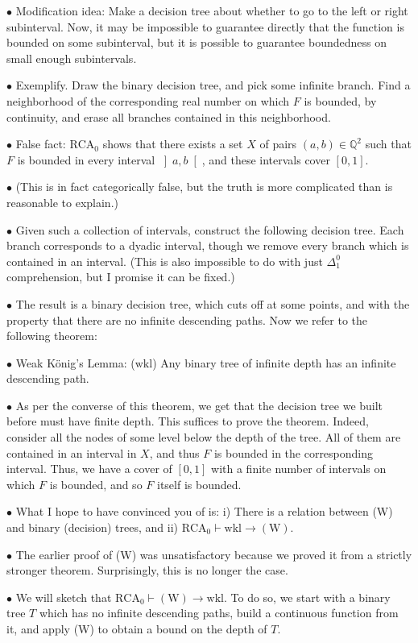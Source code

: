\documentclass{article}
\theoremstyle{nonumberplain}
\newcommand{\Q}{\mathbb{Q}}
\newcommand{\RCA}{\mathrm{RCA}}
\newcommand{\wkl}{\mathrm{wkl}}
\newcommand\point[1]{\noindent \hspace{\labelsep} $\bullet$ #1 \smallskip}
\newcommand\thname[1]{\mathrm{(#1)}}
\begin{document}
\point{Modification idea: Make a decision tree about whether to go to the left or right subinterval. Now, it may be impossible to guarantee directly that the function is bounded on some subinterval, but it is possible to guarantee boundedness on small enough subintervals.}

\point{Exemplify. Draw the binary decision tree, and pick some infinite branch. Find a neighborhood of the corresponding real number on which $F$ is bounded, by continuity, and erase all branches contained in this neighborhood.}

\point{False fact: $\RCA_0$ shows that there exists a set $X$ of pairs $(a,b) \in \Q^2$ such that $F$ is bounded in every interval $\left]a,b\right[$, and these intervals cover $[0,1]$.}

\point{(This is in fact categorically false, but the truth is more complicated than is reasonable to explain.)}

\point{Given such a collection of intervals, construct the following decision tree. Each branch corresponds to a dyadic interval, though we remove every branch which is contained in an interval. (This is also impossible to do with just $\Delta^0_1$ comprehension, but I promise it can be fixed.)}

\point{The result is a binary decision tree, which cuts off at some points, and with the property that there are no infinite descending paths. Now we refer to the following theorem:}

\point{Weak König's Lemma: ($\wkl$) Any binary tree of infinite depth has an infinite descending path.}

\point{As per the converse of this theorem, we get that the decision tree we built before must have finite depth. This suffices to prove the theorem. Indeed, consider all the nodes of some level below the depth of the tree. All of them are contained in an interval in $X$, and thus $F$ is bounded in the corresponding interval. Thus, we have a cover of $[0,1]$ with a finite number of intervals on which $F$ is bounded, and so $F$ itself is bounded.}

\point{What I hope to have convinced you of is: i) There is a relation between (W) and binary (decision) trees, and ii) $\RCA_0 \vdash \wkl \rightarrow \thname W$.}

\point{The earlier proof of (W) was unsatisfactory because we proved it from a strictly stronger theorem. Surprisingly, this is no longer the case.}

\point{We will sketch that $\RCA_0 \vdash \thname W \rightarrow \wkl$. To do so, we start with a binary tree $T$ which has no infinite descending paths, build a continuous function from it, and apply (W) to obtain a bound on the depth of $T$.}
\end{document}
